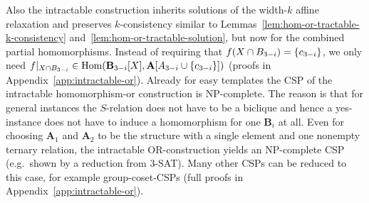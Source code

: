 \documentclass[a4paper,english, thm-restate]{lipics-v2021}
\DeclarePairedDelimiter\set{\lbrace}{\rbrace}
\newcommand{\StructA}{\mathbf{A}}
\newcommand{\StructB}{\mathbf{B}}
\newcommand{\restrict}[2]{#1|_{#2}}
\newcommand{\Hom}[2]{\mathrm{Hom}(#1,#2)}
\begin{document}
	\noindent Also the intractable construction inherits solutions of the width-$k$ affine relaxation and preserves $k$\nobreakdash-consistency similar to  Lemmas~\ref{lem:hom-or-tractable-k-consistency}
	and~\ref{lem:hom-or-tractable-solution}, but now for the combined partial homomorphisms.
	Instead of  requiring that $f(X \cap B_{3-i}) = \set{c_{3-i}}$,
	we only need  $\restrict{f}{X \cap B_{3-i}} \in \Hom{\StructB_{3-i}[X]}{{\StructA[A_{3-i} \cup \set{c_{3-i}}]}}$  (proofs in Appendix~\ref{app:intractable-or}). 
	Already for easy templates
	the CSP of the intractable homomor\-phism-or construction is NP-complete.
	The reason is that for general instances the $S$-relation does not have to be a biclique and hence a yes-instance does not have to induce a homomorphism for one $\StructB_i$ at all.
	Even for choosing $\StructA_1$ and $\StructA_2$
	to be the structure with a single element and one nonempty ternary relation, the intractable OR-construction yields an NP-complete CSP (e.g.~shown by a reduction from $3$-SAT).
	Many other CSPs can be reduced to this case, for example group-coset-CSPs (full proofs in
	Appendix~\ref{app:intractable-or}).
	
	
	
	
	
	\newcommand{\grpCSP}[3]{\mathcal{C}^{#1,#2,#3}}
	\newcommand{\grpCSPf}[3]{\mathcal{C}^{#3}}
	\newcommand{\egrpCSP}[4]{\mathcal{C}^{#1,#2,#3}_{#4}}
	\newcommand{\egrpCSPf}[4]{\mathcal{C}^{#3}_{#4}}
	
	
	
\end{document}
